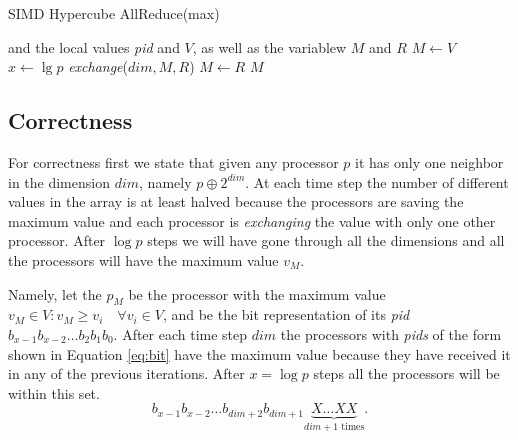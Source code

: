 \documentclass[a4paper]{article}
\begin{document}
        \begin{algorithm}
            \caption{SIMD Hypercube AllReduce(max)}\label{alg:SIMD}
            \begin{algorithmic}[1]
                 and the local values \emph{pid} and $V$, as well as the variablew $M$ and $R$
                \Statex
                    \State $M \gets V$ 
                    \State $x \gets \lg p$
                        \State \emph{exchange}($dim,M,R$) 
                         
                            \State $M\gets R$ 
                        \EndIf
                    \EndFor
                    \State \Return $M$ 
                \EndProcedure
            \end{algorithmic}
        \end{algorithm}
\newpage
    \subsection{Correctness}
        For correctness first we state that given any processor $p$ it has only one neighbor in the dimension $dim$, namely $p \oplus 2^{dim}$.
        At each time step the number of different values in the array is at least halved because the processors are saving the maximum value and each processor is \emph{exchanging} the value with only one other processor. After $\log p$ steps we will have gone through all the dimensions and all the processors will have the maximum value $v_M$.

        Namely, let the $p_M$ be the processor with the maximum value $v_M \in V : v_M \geq v_i \quad\forall v_i \in V$, and be the bit representation of its \emph{pid} $b_{x-1}b_{x-2}\ldots b_2 b_1 b_0$. After each time step $dim$ the processors with \emph{pids} of the form shown in Equation \ref{eq:bit} have the maximum value because they have received it in any of the previous iterations. After $x = \log p$ steps all the processors will be within this set.
        \begin{equation}
            b_{x-1}b_{x-2}\ldots b_{dim+2} b_{dim+1} \underbrace{X \ldots X X}_{\text{$dim+1$ times}}.
            \label{eq:bit}
        \end{equation}
\end{document}
